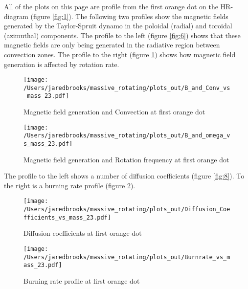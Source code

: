 \documentclass{article}
\begin{document}
        \pagebreak

        All of the plots on this page are profile from the first orange dot on the HR-diagram (figure \ref{fig:1}).  The following two profiles show the magnetic fields generated by the Taylor-Spruit dynamo in the poloidal (radial) and toroidal (azimuthal) components.  The profile to the left (figure \ref{fig:6}) shows that these magnetic fields are only being generated in the radiative region between convection zones.  The profile to the right (figure \ref{fig:7}) shows how magnetic field generation is affected by rotation rate.

        \begin{figure}[H]
          \begin{minipage}[b]{0.5\linewidth}
            \centering
            \texttt{[image: /Users/jaredbrooks/massive\_rotating/plots\_out/B\_and\_Conv\_vs\_mass\_23.pdf]}
            \caption{Magnetic field generation and Convection at first orange dot}
            \label{fig:6}
          \end{minipage}
          \hspace{0cm}
          \begin{minipage}[b]{0.5\linewidth}
            \centering
            \texttt{[image: /Users/jaredbrooks/massive\_rotating/plots\_out/B\_and\_omega\_vs\_mass\_23.pdf]}
            \caption{Magnetic field generation and Rotation frequency at first orange dot}
            \label{fig:7}
          \end{minipage}
        \end{figure}

        The profile to the left shows a number of diffusion coefficients (figure \ref{fig:8}).  To the right is a burning rate profile (figure \ref{fig:9}).

        \begin{figure}[H]
          \begin{minipage}[b]{0.5\linewidth}
            \centering
            \texttt{[image: /Users/jaredbrooks/massive\_rotating/plots\_out/Diffusion\_Coefficients\_vs\_mass\_23.pdf]}
            \caption{Diffusion coefficients at first orange dot}
            \label{fig:8}
          \end{minipage}
          \hspace{0cm}
          \begin{minipage}[b]{0.5\linewidth}
            \centering
            \texttt{[image: /Users/jaredbrooks/massive\_rotating/plots\_out/Burnrate\_vs\_mass\_23.pdf]}
            \caption{Burning rate profile at first orange dot}
            \label{fig:9}
          \end{minipage}
        \end{figure}
\end{document}
